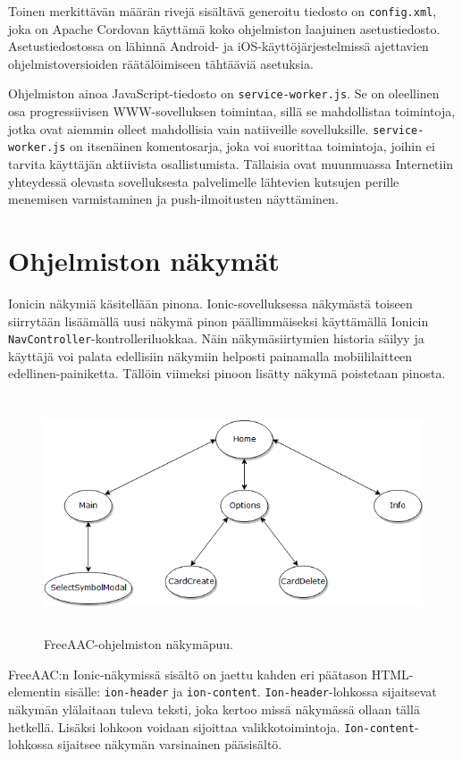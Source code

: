\documentclass[utf8]{gradu3}
\begin{document}
Toinen merkittävän määrän rivejä sisältävä generoitu tiedosto on \texttt{config.xml}, joka on Apache Cordovan käyttämä koko ohjelmiston laajuinen asetustiedosto. Asetustiedostossa on lähinnä Android- ja iOS-käyttöjärjestelmissä ajettavien ohjelmistoversioiden räätälöimiseen tähtääviä asetuksia.

Ohjelmiston ainoa JavaScript-tiedosto on \texttt{service-worker.js}. Se on oleellinen osa progressiivisen WWW-sovelluksen toimintaa, sillä se mahdollistaa toimintoja, jotka ovat aiemmin olleet mahdollisia vain natiiveille sovelluksille. \texttt{service-worker.js} on itsenäinen komentosarja, joka voi suorittaa toimintoja, joihin ei tarvita käyttäjän aktiivista osallistumista. Tällaisia ovat muunmuassa Internetiin yhteydessä olevasta sovelluksesta palvelimelle lähtevien kutsujen perille menemisen varmistaminen ja push-ilmoitusten näyttäminen.

\section{Ohjelmiston näkymät}

Ionicin näkymiä käsitellään pinona. Ionic-sovelluksessa näkymästä toiseen siirrytään lisäämällä uusi näkymä pinon päällimmäiseksi käyttämällä Ionicin \texttt{NavController}-kontrolleriluokkaa. Näin näkymäsiirtymien historia säilyy ja käyttäjä voi palata edellisiin näkymiin helposti painamalla mobiililaitteen edellinen-painiketta. Tällöin viimeksi pinoon lisätty näkymä poistetaan pinosta.

\begin{figure}[h]\centering
  \includegraphics[height=7cm,keepaspectratio]{FreeAACViews}
  \caption[FreeAAC-sovelluksen näkymäpuu.]
  {FreeAAC-ohjelmiston näkymäpuu.}
  \label{fig:FreeAACViews}
\end{figure}

FreeAAC:n Ionic-näkymissä sisältö on jaettu kahden eri päätason HTML-elementin sisälle: \texttt{ion-header} ja \texttt{ion-content}. \texttt{Ion-header}-lohkossa sijaitsevat näkymän ylälaitaan tuleva teksti, joka kertoo missä näkymässä ollaan tällä hetkellä. Lisäksi lohkoon voidaan sijoittaa valikkotoimintoja. \texttt{Ion-content}-lohkossa sijaitsee näkymän varsinainen pääsisältö.
\end{document}
